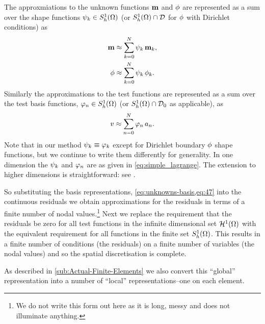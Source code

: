 The approxmiations to the unknown functions $\mathbf{m}$ and $\phi$ are represented as a sum over the shape functions ${\psi_k} \in {S_h^1(\Omega)}$ (or ${S_h^1(\Omega)} \cap \mathcal{D}$ for $\phi$ with Dirichlet conditions) as
\begin{equation}
  \begin{aligned}
    \mathbf{m} &\approx \sum_{k = 0}^{N} {\psi_k} \, \mathbf{m}_k, \\
    \phi &\approx \sum_{k = 0}^{N} {\psi_k} \, \phi_{k}.
    \label{eq:unknowns-basis}
  \end{aligned}
\end{equation}
Similarly the approximations to the test functions are represented as a sum over the test basis functions, ${\varphi_n} \in {S_h^1(\Omega)}$ (or ${S_h^1(\Omega)} \cap \mathcal{D}_0$ as applicable), as
\begin{equation}
  \label{eq:47}
  v \approx \sum_{n = 0}^{N} {\varphi_n} \, a_n.
\end{equation}
Note that in our method $\psi_k \equiv \varphi_k$ except for Dirichlet boundary $\phi$ shape functions, but we continue to write them differently for generality.
In one dimension the ${\psi_k}$ and ${\varphi_n}$ are as given in \cref{eq:simple_lagrange}.
The extension to higher dimensions is straightforward: see \eg \cite[25]{HowardElmanDavidSilvester2006}.

So substituting the basis representations, \cref{eq:unknowns-basis,eq:47} into the continuous residuals we obtain approximations for the residuals in terms of a finite number of nodal values.\footnote{We do not write this form out here as it is long, messy and does not illuminate anything.}
Next we replace the requirement that the residuals be zero for all test functions in the infinite dimensional set ${\mathcal{H}^1(\Omega)}$ with the equivalent requirement for all functions in the finite set ${S_h^1(\Omega)}$. 
This results in a finite number of conditions (the residuals) on a finite number of variables (the nodal values) and so the spatial discretisation is complete.

As described in \cref{sub:Actual-Finite-Elements} we also convert this ``global'' representation into a number of ``local'' representations--one on each element.



